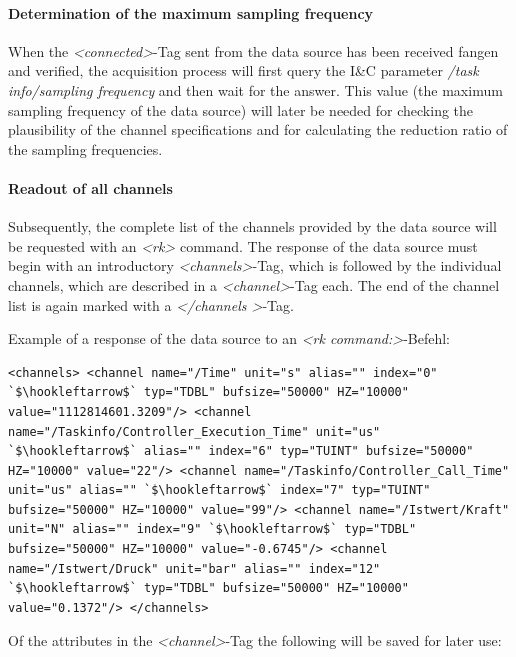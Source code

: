 \documentclass[a4paper,12pt,BCOR6mm,bibtotoc,idxtotoc]{scrbook}
\begin{document}
\paragraph{Determination of the maximum sampling frequency} When the \textit{\textless connected\textgreater}-Tag sent from the data source has been received \-fan\-gen  and verified, the acquisition process will first query the I\&C parameter \textit{/task info/sampling frequency} and then wait for the answer. This value (the maximum sampling frequency of the data source) will later be needed for checking the plausibility of the channel specifications and for calculating the reduction ratio of the sampling frequencies.

\paragraph{Readout of all channels} Subsequently, the complete list of the channels provided by the data source will be requested with an \textit{\textless rk\textgreater} command. The response of the data source must begin with an introductory \textit{\textless channels\textgreater}-Tag, which is followed by the individual channels, which are described in a \textit{\textless channel\textgreater}-Tag each. The end of the channel list is again marked with a \textit{\textless /channels \textgreater}-Tag.

Example of a response of the data source to an \textit{\textless rk command:\textgreater}-Befehl:

\begin{lstlisting}[basicstyle=\ttfamily\scriptsize] <channels> <channel name="/Time" unit="s" alias="" index="0" `$\hookleftarrow$` typ="TDBL" bufsize="50000" HZ="10000" value="1112814601.3209"/> <channel name="/Taskinfo/Controller_Execution_Time" unit="us" `$\hookleftarrow$` alias="" index="6" typ="TUINT" bufsize="50000" HZ="10000" value="22"/> <channel name="/Taskinfo/Controller_Call_Time" unit="us" alias="" `$\hookleftarrow$` index="7" typ="TUINT" bufsize="50000" HZ="10000" value="99"/> <channel name="/Istwert/Kraft" unit="N" alias="" index="9" `$\hookleftarrow$` typ="TDBL" bufsize="50000" HZ="10000" value="-0.6745"/> <channel name="/Istwert/Druck" unit="bar" alias="" index="12" `$\hookleftarrow$` typ="TDBL" bufsize="50000" HZ="10000" value="0.1372"/> </channels> \end{lstlisting}

Of the attributes in the \textit{\textless channel\textgreater}-Tag the following will be saved for later use:
\end{document}
